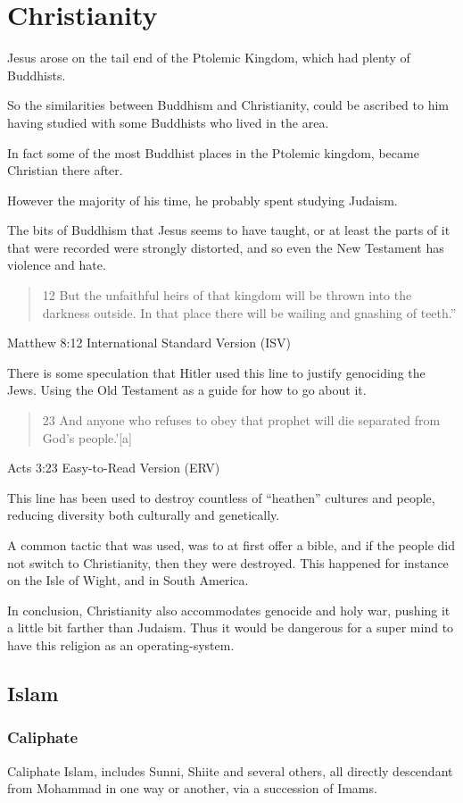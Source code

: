 \chapter{Christianity}
Jesus arose on the tail end of the Ptolemic Kingdom, 
which had plenty of Buddhists.  

So the similarities between Buddhism and Christianity,
could be ascribed to him having studied with some Buddhists who lived in the
area. 

In fact some of the most Buddhist places in the Ptolemic kingdom,
 became Christian there after. 

However the majority of his time, he probably spent studying Judaism.

The bits of Buddhism that Jesus seems to have taught, or at least the
parts of it that were recorded were strongly distorted, and so even the New
Testament has violence and hate.

\blockquote{12 But the unfaithful heirs of that kingdom will be thrown into
the darkness outside. In that place there will be wailing and gnashing of
teeth.”
} {Matthew 8:12 International Standard Version (ISV)}

There is some speculation that Hitler used this line to justify genociding
the Jews. Using the Old Testament as a guide for how to go about it.

\blockquote{23 And anyone who refuses to obey that prophet will die separated
from God’s people.’[a] }{Acts 3:23 Easy-to-Read Version (ERV)}

This line has been used to destroy countless of ``heathen'' cultures and people,
 reducing diversity both culturally and genetically. 

A common tactic that was used, was to at first offer a bible, and if the people
did not switch to Christianity, then they were destroyed.  This happened for 
instance on the Isle of Wight, and in South America.

In conclusion, Christianity also accommodates genocide and holy war,  pushing it
a little bit farther than Judaism. Thus it would be dangerous for a super mind
to have this religion as an operating-system. 

\section{Islam}
\subsection{Caliphate}
Caliphate Islam, includes Sunni, Shiite and several others,  all directly
descendant from Mohammad in one way or another, via a succession of Imams. 

